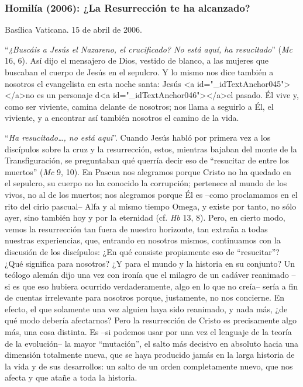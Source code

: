 			\subsubsection{Homilía (2006): ¿La Resurrección te ha alcanzado?}
			
			\begin{referencia}Basílica Vaticana. 15 de abril de 2006.\end{referencia}
			
			\begin{body}“\textit{¿Buscáis a Jesús el Nazareno, el crucificado? No está aquí, ha resucitado}” (\textit{Mc} 16, 6). Así dijo el mensajero de Dios, vestido de blanco, a las mujeres que buscaban el cuerpo de Jesús en el sepulcro. Y lo mismo nos dice también a nosotros el evangelista en esta noche santa: Jesús <a id="_idTextAnchor045"></a>no es un personaje d<a id="_idTextAnchor046"></a>el pasado. Él vive y, como ser viviente, camina delante de nosotros; nos llama a seguirlo a Él, el viviente, y a encontrar así también nosotros el camino de la vida.\end{body}
			
			\begin{body}“\textit{Ha resucitado…, no está aquí}”. Cuando Jesús habló por primera vez a los discípulos sobre la cruz y la resurrección, estos, mientras bajaban del monte de la Transfiguración, se preguntaban qué querría decir eso de “resucitar de entre los muertos” (\textit{Mc} 9, 10). En Pascua nos alegramos porque Cristo no ha quedado en el sepulcro, su cuerpo no ha conocido la corrupción; pertenece al mundo de los vivos, no al de los muertos; nos alegramos porque Él es –como proclamamos en el rito del cirio pascual– Alfa y al mismo tiempo Omega, y existe por tanto, no sólo ayer, sino también hoy y por la eternidad (cf. \textit{Hb} 13, 8). Pero, en cierto modo, vemos la resurrección tan fuera de nuestro horizonte, tan extraña a todas nuestras experiencias, que, entrando en nosotros mismos, continuamos con la discusión de los discípulos: ¿En qué consiste propiamente eso de “resucitar”? ¿Qué significa para nosotros? ¿Y para el mundo y la historia en su conjunto? Un teólogo alemán dijo una vez con ironía que el milagro de un cadáver reanimado –si es que eso hubiera ocurrido verdaderamente, algo en lo que no creía– sería a fin de cuentas irrelevante para nosotros porque, justamente, no nos concierne. En efecto, el que solamente una vez alguien haya sido reanimado, y nada más, ¿de qué modo debería afectarnos? Pero la resurrección de Cristo es precisamente algo más, una cosa distinta. Es –si podemos usar por una vez el lenguaje de la teoría de la evolución– la mayor “mutación”, el salto más decisivo en absoluto hacia una dimensión totalmente nueva, que se haya producido jamás en la larga historia de la vida y de sus desarrollos: un salto de un orden completamente nuevo, que nos afecta y que atañe a toda la historia.\end{body}
			
